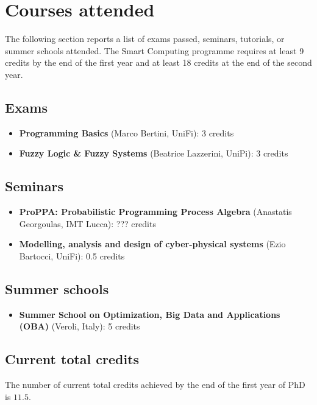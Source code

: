 
\section*{Courses attended}
  The following section reports a list of exams passed, seminars, tutorials, or summer schools attended. The Smart Computing  programme requires at least 9 credits by the end of the first year and at least 18 credits at the end of the second year.

  \subsection*{Exams}
  
    \begin{itemize}
      \item \textbf{ Programming Basics} (Marco Bertini, UniFi): 3 credits
      \item \textbf{Fuzzy Logic \& Fuzzy Systems} (Beatrice Lazzerini, UniPi): 3 credits
    \end{itemize}
    
  \subsection*{Seminars}
  
    \begin{itemize}
      \item \textbf{ProPPA: Probabilistic Programming Process Algebra} (Anastatis Georgoulas, IMT Lucca): ??? credits
      \item \textbf{Modelling, analysis and design of cyber-physical systems} (Ezio Bartocci, UniFi): 0.5 credits
    \end{itemize}
    
  \subsection*{Summer schools}
  
    \begin{itemize}
      \item \textbf{Summer School on Optimization, Big Data and Applications (OBA)} (Veroli, Italy): 5 credits
    \end{itemize}
    
  \subsection*{Current total credits}
  
    The number of current total credits achieved by the end of the first year of \ac{PhD} is $11.5$.
    
\newpage
  